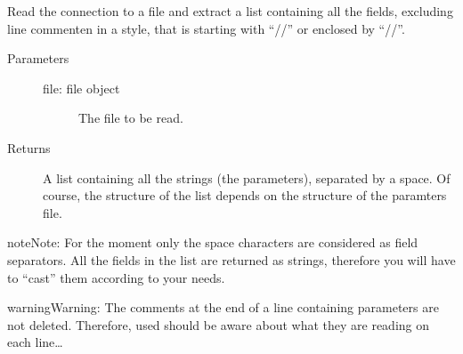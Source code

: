 \documentclass[letterpaper,10pt,english]{sphinxmanual}
\begin{document}

\begin{fulllineitems}
\label{\detokenize{appendices:s2Dcd.utili.skip_ccomments}}
Read the connection to a file and extract a list containing all
the fields, excluding line commenten in a  style, that is
starting with “//” or enclosed by “//”.
\begin{description}
\item[{Parameters}] \leavevmode\begin{description}
\item[{file: file object}] \leavevmode
The file to be read.

\end{description}

\item[{Returns}] \leavevmode
A list containing all the strings (the parameters), separated
by a space.  Of course, the structure of the list depends on
the structure of the paramters file.

\end{description}

\begin{sphinxadmonition}{note}{Note:}
For the moment only the space characters are considered as field
separators. All the fields in the list are returned as strings,
therefore you will have to “cast” them according to your needs.
\end{sphinxadmonition}

\begin{sphinxadmonition}{warning}{Warning:}
The comments at the end of a line containing parameters are
not deleted. Therefore, used should be aware about what they
are reading on each line…
\end{sphinxadmonition}

\end{fulllineitems}
\end{document}
